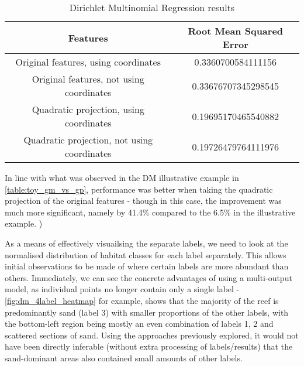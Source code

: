 \begin{table}
    \centering
    \begin{tabular}{|c|c|}
        \hline
        Features & Root Mean Squared Error \\\hline
        Original features, using coordinates & 0.3360700584111156 \\
        Original features, not using coordinates & 0.33676707345298545 \\
        Quadratic projection, using coordinates & 0.19695170465540882 \\
        Quadratic projection, not using coordinates & 0.19726479764111976 \\
        \hline
    \end{tabular}
    \label{table:dmbasicresults}
    \caption{Dirichlet Multinomial Regression results}
\end{table}

In line with what was observed in the DM illustrative example in \autoref{table:toy_gm_vs_gp}, performance was better when taking the quadratic projection of the original features - though in this case, the improvement was much more significant, namely by 41.4\% compared to the 6.5\% in the illustrative example. )

As a means of effectively visuailsing the separate labels, we need to look at the normalised distribution of habitat classes for each label separately. This allows initial observations to be made of where certain labels are more abundant than others. Immediately, we can see the concrete advantages of using a multi-output model, as individual points no longer contain only a single label - \autoref{fig:dm_4label_heatmap} for example, shows that the majority of the reef is predominantly sand (label 3) with smaller proportions of the other labels, with the bottom-left region being mostly an even combination of labels 1, 2  and scattered sections of sand. Using the approaches previously explored, it would not have been directly inferable (without extra processing of labels/results) that the sand-dominant areas also contained small amounts of other labels.



